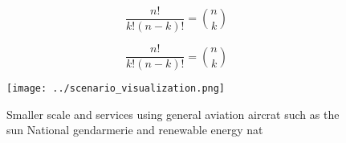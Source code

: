 \documentclass[a4paper]{article}
\begin{document}
\[ \frac{n!}{k!(n-k)!} = \binom{n}{k} \]

\[ \frac{n!}{k!(n-k)!} = \binom{n}{k} \]

\begin{figure}
\centering
\texttt{[image: ../scenario\_visualization.png]}
\caption{Smaller scale and services using general aviation aircrat such as the sun National gendarmerie and renewable energy nat
}
\end{figure}
 
\end{document}
